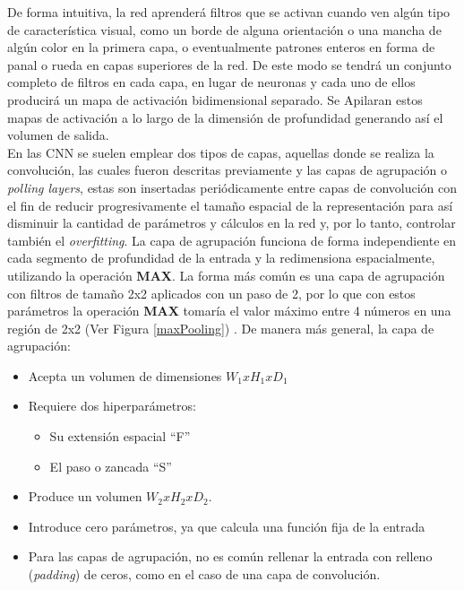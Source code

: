 De forma intuitiva, la red aprenderá filtros que se activan cuando ven algún tipo de característica visual, como un borde de alguna orientación o una mancha de algún color en la primera capa, o eventualmente patrones enteros en forma de panal o rueda en capas superiores de la red. De este modo se tendrá un conjunto completo de filtros en cada capa, en lugar de neuronas y cada uno de ellos producirá un mapa de activación bidimensional separado. Se Apilaran estos mapas de activación a lo largo de la dimensión de profundidad generando así el volumen de salida\cite{CS231n}.
\\ 
En las CNN se suelen emplear dos tipos de capas, aquellas donde se realiza la convolución, las cuales fueron descritas previamente y las capas de agrupación o \textit{polling layers}, estas son insertadas periódicamente entre capas de convolución con el fin de reducir progresivamente el tamaño espacial de la representación para así disminuir la cantidad de parámetros y cálculos en la red y, por lo tanto, controlar también el \textit{overfitting}. La capa de agrupación funciona de forma independiente en cada segmento de profundidad de la entrada y la redimensiona espacialmente, utilizando la operación \textbf{MAX}. La forma más común es una capa de agrupación con filtros de tamaño 2x2 aplicados con un paso de 2, por lo que con estos parámetros la operación \textbf{MAX} tomaría el valor máximo entre 4 números en una región de 2x2 (Ver Figura \ref{maxPooling}) \cite{CS231n}. De manera más general, la capa de agrupación:
\begin{itemize}
    \item Acepta un volumen de dimensiones $W_{1}xH_{1}xD_{1}$
    \item Requiere dos hiperparámetros:
    \begin{itemize}
        \item Su extensión espacial ``F''
        \item El paso o zancada ``S''
    \end{itemize}
    \item Produce un volumen $W_{2}xH_{2}xD_{2}$.
    \item Introduce cero parámetros, ya que calcula una función fija de la entrada
    \item Para las capas de agrupación, no es común rellenar la entrada con relleno (\textit{padding}) de ceros, como en el caso de una capa de convolución.
\end{itemize}
